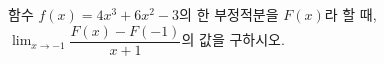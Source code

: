 함수 $f(x)=4x^3+6x^2-3$의 한 부정적분을 $F(x)$라 할 때, $\displaystyle\lim_{x\to-1}\dfrac{F(x)-F(-1)}{x+1}$의 값을 구하시오.
